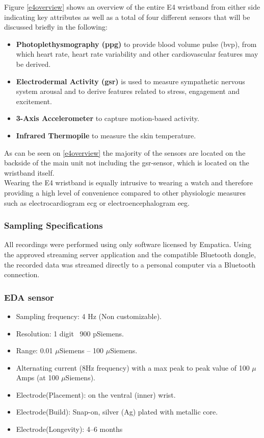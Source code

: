 Figure \ref{e4overview} shows an overview of the entire E4 wristband from either side indicating key attributes as well as a total of four different sensors that will be discussed briefly in the following:

\begin{itemize}
\item \textbf{Photoplethysmography (\gls{ppg})} to provide blood volume pulse (\gls{bvp}), from which heart rate, heart rate variability and other cardiovascular features may be derived.
\item \textbf{Electrodermal Activity (\gls{gsr})} is used to measure sympathetic nervous system arousal and to derive features related to stress, engagement and excitement.
\item \textbf{3-Axis Accelerometer} to capture motion-based activity.
\item \textbf{Infrared Thermopile} to measure the skin temperature.
\end{itemize}

As can be seen on \ref{e4overview} the majority of the sensors are located on the backside of the main unit not including the \gls{gsr}-sensor, which is located on the wristband itself.\\
\newpage
Wearing the E4 wristband is equally intrusive to wearing a watch and therefore providing a high level of convenience compared to other physiologic measures such as electrocardiogram \gls{ecg} or electroencephalogram \gls{eeg}.\\

\subsubsection{Sampling Specifications}
All recordings were performed using only software licensed by Empatica. Using the approved streaming server application and the compatible Bluetooth dongle, the recorded data was streamed directly to a personal computer via a Bluetooth connection. 
\newpage
\subsubsection{EDA sensor}
\begin{itemize}
\item Sampling frequency: 4 Hz (Non customizable).
\item Resolution: 1 digit ~900 pSiemens.
\item Range: 0.01 $\mu$Siemens – 100 $\mu$Siemens.
\item Alternating current (8Hz frequency) with a
max peak to peak value of 100 $\mu$Amps (at 100
$\mu$Siemens).
\item Electrode(Placement): on the ventral (inner) wrist.
\item Electrode(Build): Snap-on, silver (Ag) plated with metallic core.
\item Electrode(Longevity): 4–6 months
\end{itemize}


